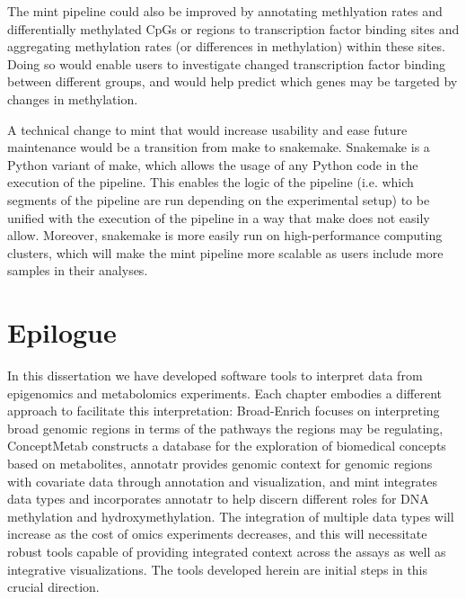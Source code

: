 The mint pipeline could also be improved by annotating methlyation rates and differentially methylated CpGs or regions to transcription factor binding sites and aggregating methylation rates (or differences in methylation) within these sites. Doing so would enable users to investigate changed transcription factor binding between different groups, and would help predict which genes may be targeted by changes in methylation.

A technical change to mint that would increase usability and ease future maintenance would be a transition from make to snakemake. Snakemake is a Python variant of make, which allows the usage of any Python code in the execution of the pipeline. This enables the logic of the pipeline (i.e. which segments of the pipeline are run depending on the experimental setup) to be unified with the execution of the pipeline in a way that make does not easily allow. Moreover, snakemake is more easily run on high-performance computing clusters, which will make the mint pipeline more scalable as users include more samples in their analyses.

\section{Epilogue}

In this dissertation we have developed software tools to interpret data from epigenomics and metabolomics experiments. Each chapter embodies a different approach to facilitate this interpretation: Broad-Enrich focuses on interpreting broad genomic regions in terms of the pathways the regions may be regulating, ConceptMetab constructs a database for the exploration of biomedical concepts based on metabolites, annotatr provides genomic context for genomic regions with covariate data through annotation and visualization, and mint integrates data types and incorporates annotatr to help discern different roles for DNA methylation and hydroxymethylation. The integration of multiple data types will increase as the cost of omics experiments decreases, and this will necessitate robust tools capable of providing integrated context across the assays as well as integrative visualizations. The tools developed herein are initial steps in this crucial direction.
